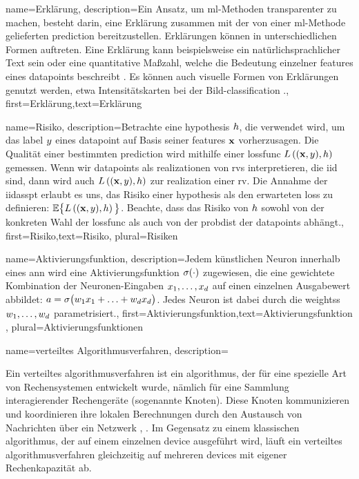 {{{{
{name={Erklärung},
	description={Ein Ansatz, um \gls{ml}-Methoden transparenter zu machen, besteht darin, 
		eine Erklärung zusammen mit der von einer \gls{ml}-Methode gelieferten 
		\gls{prediction} bereitzustellen. Erklärungen können in unterschiedlichen Formen auftreten. 
		Eine Erklärung kann beispielsweise ein natürlichsprachlicher Text sein oder eine quantitative 
		Maßzahl, welche die Bedeutung einzelner \gls{feature}s eines \gls{datapoint}s beschreibt \cite{Molnar2019}. 
		Es können auch visuelle Formen von Erklärungen genutzt werden, etwa Intensitätskarten bei der Bild-\gls{classification} \cite{GradCamPaper}.},
	first={Erklärung},text={Erklärung} 
}

{name={Risiko},
	description={Betrachte eine \gls{hypothesis} $h$, die verwendet wird, um das \gls{label} 
		$y$ eines \gls{datapoint} auf Basis seiner \gls{feature}s ${\bf x}$ vorherzusagen. 
		Die Qualität einer bestimmten \gls{prediction} wird mithilfe einer \gls{lossfunc} 
		$L\left(({\bf x},y),h \right)$ gemessen. Wenn wir \gls{datapoint}s als 
		\gls{realization}en von \glspl{rv} interpretieren, die \gls{iid} sind, dann wird auch 
		$L\left(({\bf x},y),h \right)$ zur \gls{realization} einer \gls{rv}. 
		Die Annahme der \gls{iidasspt} erlaubt es uns, das Risiko einer \gls{hypothesis} als den erwarteten 
		\gls{loss} zu definieren: $\mathbb{E} \big\{L\left(({\bf x},y),h \right) \big\}$. 
		Beachte, dass das Risiko von $h$ sowohl von der konkreten Wahl der \gls{lossfunc} 
		als auch von der \gls{probdist} der \gls{datapoint}s abhängt.},
	first={Risiko},text={Risiko}, plural={Risiken}
}

{name={Aktivierungsfunktion},
	description={Jedem künstlichen Neuron innerhalb eines \gls{ann} 
		wird eine Aktivierungsfunktion $\sigma(\cdot)$ zugewiesen, die eine gewichtete 
		Kombination der Neuronen-Eingaben $x_{1},\ldots,x_{d}$ 
		auf einen einzelnen Ausgabewert abbildet: 
		$a = \sigma\big(w_{1} x_{1}+\ldots+w_{d} x_{d} \big)$. 
		Jedes Neuron ist dabei durch die \glspl{weights} $w_{1},\ldots,w_{d}$ parametrisiert.},
	first={Aktivierungsfunktion},text={Aktivierungsfunktion} , plural={Aktivierungsfunktionen}
}

{name={verteiltes Algorithmusverfahren},
	description={Ein verteiltes \gls{algorithmus}verfahren ist ein \gls{algorithmus}, 
		der für eine spezielle Art von Rechensystemen entwickelt wurde, nämlich für eine Sammlung 
		interagierender Rechengeräte (sogenannte Knoten). Diese Knoten kommunizieren und koordinieren 
		ihre lokalen Berechnungen durch den Austausch von Nachrichten über ein Netzwerk 
		\cite{IntroDistAlg}, \cite{ParallelDistrBook}. Im Gegensatz zu einem klassischen \gls{algorithmus}, 
		der auf einem einzelnen \gls{device} ausgeführt wird, läuft ein verteiltes \gls{algorithmus}verfahren 
		gleichzeitig auf mehreren \gls{device}s mit eigener Rechenkapazität ab. 
		
}}}}}}
